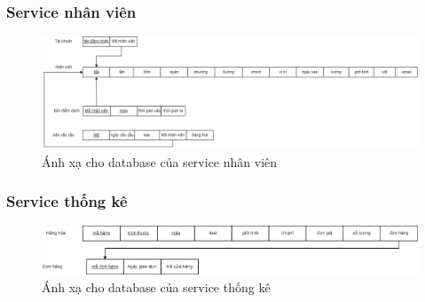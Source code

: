 \subsubsection{Service nhân viên}
\begin{figure}[!htp]
    \begin{center}
        \includegraphics[width=1\textwidth]{img/database/mapping/staff.png}
        \newline
        \caption{Ánh xạ cho database của service nhân viên}
    \end{center}
\end{figure}


\subsubsection{Service thống kê}
\begin{figure}[!htp]
    \begin{center}
        \includegraphics[width=1\textwidth]{img/database/mapping/Statistic.png}
        \newline
        \caption{Ánh xạ cho database của service thống kê}
    \end{center}
\end{figure}